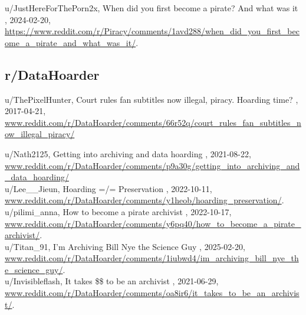 u/JustHereForThePorn2x, \og When did you first become a pirate? And what was it \fg, 2024-02-20, \href{https://www.reddit.com/r/Piracy/comments/1avd288/when\_did\_you\_first\_become\_a\_pirate\_and\_what\_was\_it/}{https://www.reddit.com/r/Piracy/comments/1avd288/when\_did\_you\_first\_become\_a\_pirate\_and\_what\_was\_it/}. \\

\subsection*{r/DataHoarder}

u/ThePixelHunter, \og Court rules fan subtitles now illegal, piracy. Hoarding time? \fg, 2017-04-21, \href{www.reddit.com/r/DataHoarder/comments/66r52q/court\_rules\_fan\_subtitles\_now\_illegal\_piracy/}{www.reddit.com/r/DataHoarder/comments/66r52q/court\_rules\_fan\_subtitles\_now\_illegal\_piracy/}

u/Nath2125, \og Getting into archiving and data hoarding \fg, 2021-08-22, \href{www.reddit.com/r/DataHoarder/comments/p9a30g/getting\_into\_archiving\_and\_data\_hoarding/}{www.reddit.com/r/DataHoarder/comments/p9a30g/getting\_into\_archiving\_and\_data\_hoarding/} \\

u/Lee\_\_Jieun, \og Hoarding =/= Preservation \fg, 2022-10-11, \href{www.reddit.com/r/DataHoarder/comments/y1heob/hoarding\_preservation/}{www.reddit.com/r/DataHoarder/comments/y1heob/hoarding\_preservation/}. \\

u/pilimi\_anna, \og How to become a pirate archivist \fg, 2022-10-17, \href{www.reddit.com/r/DataHoarder/comments/y6pq40/how\_to\_become\_a\_pirate\_archivist/}{www.reddit.com/r/DataHoarder/comments/y6pq40/how\_to\_become\_a\_pirate\_archivist/}. \\ 

u/Titan\_91, \og I'm Archiving Bill Nye the Science Guy \fg, 2025-02-20, \href{www.reddit.com/r/DataHoarder/comments/1iubwd4/im\_archiving\_bill\_nye\_the\_science\_guy/}{www.reddit.com/r/DataHoarder/comments/1iubwd4/im\_archiving\_bill\_nye\_the\_science\_guy/}. \\

u/Invisibleflash, \og It takes \$\$ to be an archivist \fg, 2021-06-29, \href{www.reddit.com/r/DataHoarder/comments/oa8ir6/it\_takes\_to\_be\_an\_archivist/}{www.reddit.com/r/DataHoarder/comments/oa8ir6/it\_takes\_to\_be\_an\_archivist/}. \\

